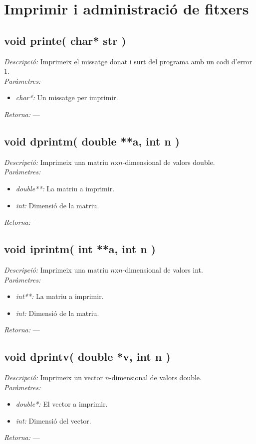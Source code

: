 \documentclass[a4paper,10pt, notitlepage]{article}
\begin{document}
\section{Imprimir i administració de fitxers}
\subsection{void printe( char* str )}
\textit{Descripció: }
  Imprimeix el missatge donat i surt del programa amb un codi d'error 1.
\\\textit{Paràmetres: }\begin{itemize}[label={--}]
  \item \textit{char*: } Un missatge per imprimir.
\end{itemize}
\textit{Retorna: } ---



\subsection{void dprintm( double **a, int n )}
\textit{Descripció: }
  Imprimeix una matriu $n$x$n$-dimensional de valors double.
\\\textit{Paràmetres: }\begin{itemize}[label={--}]
  \item \textit{double**: } La matriu a imprimir.
  \item \textit{int: } Dimensió de la matriu.
\end{itemize}
\textit{Retorna: } ---



\subsection{void iprintm( int **a, int n )}
\textit{Descripció: }
  Imprimeix una matriu $n$x$n$-dimensional de valors int.
\\\textit{Paràmetres: }\begin{itemize}[label={--}]
  \item \textit{int**: } La matriu a imprimir.
  \item \textit{int: } Dimensió de la matriu.
\end{itemize}
\textit{Retorna: } ---



\subsection{void dprintv( double *v, int n )}
\textit{Descripció: }
  Imprimeix un vector $n$-dimensional de valors double.
\\\textit{Paràmetres: }\begin{itemize}[label={--}]
  \item \textit{double*: } El vector a imprimir.
  \item \textit{int: } Dimensió del vector.
\end{itemize}
\textit{Retorna: } ---
\end{document}
